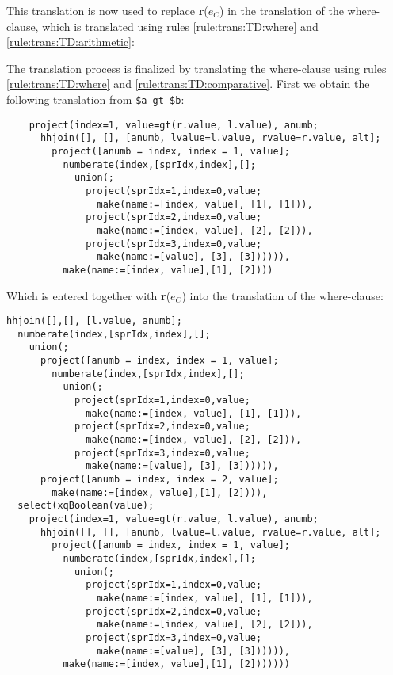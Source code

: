 This translation is now used to replace \textbf{r}($e_C$) in the translation
of the where-clause, which is translated using rules \ref{rule:trans:TD:where}
and \ref{rule:trans:TD:arithmetic}:

The translation process is finalized by translating the where-clause using rules
\ref{rule:trans:TD:where} and \ref{rule:trans:TD:comparative}. First we
obtain the following translation from \texttt{\$a gt \$b}:

\begin{Verbatim}
    project(index=1, value=gt(r.value, l.value), anumb;
      hhjoin([], [], [anumb, lvalue=l.value, rvalue=r.value, alt];
        project([anumb = index, index = 1, value];
          numberate(index,[sprIdx,index],[];
            union(;
              project(sprIdx=1,index=0,value;
                make(name:=[index, value], [1], [1])),
              project(sprIdx=2,index=0,value;
                make(name:=[index, value], [2], [2])),
              project(sprIdx=3,index=0,value;
                make(name:=[value], [3], [3]))))),
          make(name:=[index, value],[1], [2])))
\end{Verbatim}

Which is entered together with \textbf{r}($e_C$) into the translation of the
where-clause:

\begin{Verbatim}
hhjoin([],[], [l.value, anumb];
  numberate(index,[sprIdx,index],[];
    union(;
      project([anumb = index, index = 1, value];
        numberate(index,[sprIdx,index],[];
          union(;
            project(sprIdx=1,index=0,value;
              make(name:=[index, value], [1], [1])),
            project(sprIdx=2,index=0,value;
              make(name:=[index, value], [2], [2])),
            project(sprIdx=3,index=0,value;
              make(name:=[value], [3], [3]))))),
      project([anumb = index, index = 2, value];
        make(name:=[index, value],[1], [2]))),
  select(xqBoolean(value);
    project(index=1, value=gt(r.value, l.value), anumb;
      hhjoin([], [], [anumb, lvalue=l.value, rvalue=r.value, alt];
        project([anumb = index, index = 1, value];
          numberate(index,[sprIdx,index],[];
            union(;
              project(sprIdx=1,index=0,value;
                make(name:=[index, value], [1], [1])),
              project(sprIdx=2,index=0,value;
                make(name:=[index, value], [2], [2])),
              project(sprIdx=3,index=0,value;
                make(name:=[value], [3], [3]))))),
          make(name:=[index, value],[1], [2]))))))
\end{Verbatim}

